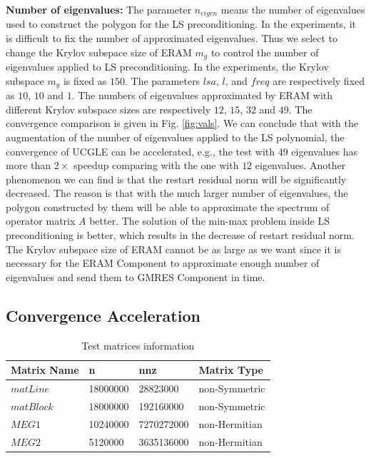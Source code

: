 \textbf{Number of eigenvalues: } The parameter $n_{eigen}$ means the number of eigenvalues used to construct the polygon for the LS preconditioning. In the experiments, it is difficult to fix the number of approximated eigenvalues. Thus we select to change the Krylov subspace size of ERAM $m_g$ to control the number of eigenvalues applied to LS preconditioning. In the experiments,  the Krylov subspace $m_g$ is fixed as $150$. The parameters $lsa$, $l$, and $freq$ are respectively fixed as $10$, $10$ and $1$. The numbers of eigenvalues approximated by ERAM with different Krylov subspace sizes are respectively $12$, $15$, $32$ and $49$. The convergence comparison is given in Fig. \ref{fig:vals}. We can conclude that with the augmentation of the number of eigenvalues applied to the LS polynomial, the convergence of UCGLE can be accelerated, e.g., the test with $49$ eigenvalues has more than $2\times$ speedup comparing with the one with $12$ eigenvalues. Another phenomenon we can find is that the restart residual norm will be significantly decreased.  The reason is that with the much larger number of eigenvalues, the polygon constructed by them will be able to approximate the spectrum of operator matrix $A$ better. The solution of the min-max problem inside LS preconditioning is better, which results in the decrease of restart residual norm. The Krylov subspace size of ERAM cannot be as large as we want since it is necessary for the ERAM Component to approximate enough number of eigenvalues and send them to GMRES Component in time.

\subsection{Convergence Acceleration}

\begin{table}[htbp]
	\renewcommand{\arraystretch}{1.2}
	\caption{Test matrices information}
	\label{matget}
	\centering
	\begin{tabular}{x{4cm}|x{3cm}|x{3cm}|x{4cm}}
		\toprule
		Matrix Name& 	n & 	nnz & 	Matrix Type\\
		\midrule
		$matLine$  & \num[round-precision=2,round-mode=figures]{18000000} & \num[round-precision=2,round-mode=figures]{28823000} & non-Symmetric\\
		\hline
		$matBlock$  & \num[round-precision=2,round-mode=figures]{18000000} & \num[round-precision=2,round-mode=figures]{192160000} & non-Symmetric\\
		\hline
		$MEG1$ & \num[round-precision=4,round-mode=figures]{10240000} & \num[round-mode = places, scientific-notation = fixed, fixed-exponent = 9,round-precision = 2]{7270272000} & non-Hermitian\\
		\hline
		$MEG2$ & \num[round-precision=2,round-mode=figures]{5120000} & \num[round-mode = places, scientific-notation = fixed, fixed-exponent = 9,round-precision = 2]{3635136000} & non-Hermitian\\
		\bottomrule
	\end{tabular}
\end{table}

